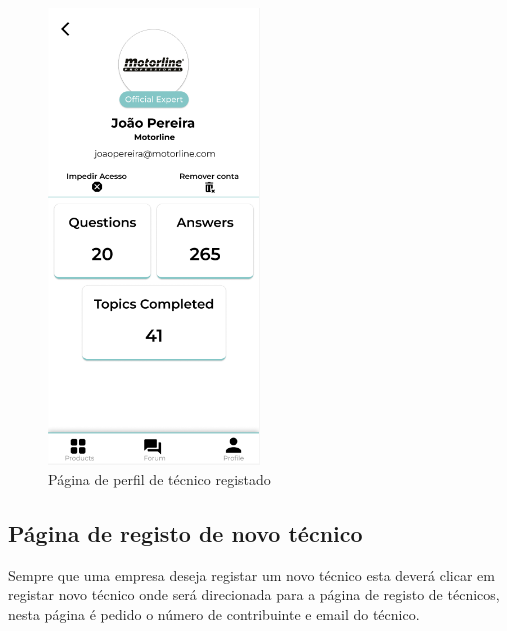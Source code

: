 \begin{figure}[htb]
    \centering
    \includegraphics[width=0.5\textwidth]{images/mockups/professional_profile.png}
    \caption{Página de perfil de técnico registado}
    \label{fig:24}
\end{figure}

\subsection{Página de registo de novo técnico}

Sempre que uma empresa deseja registar um novo técnico esta deverá clicar em registar novo técnico onde será
direcionada para a página de registo de técnicos, nesta página é pedido o número de contribuinte e email do 
técnico.

